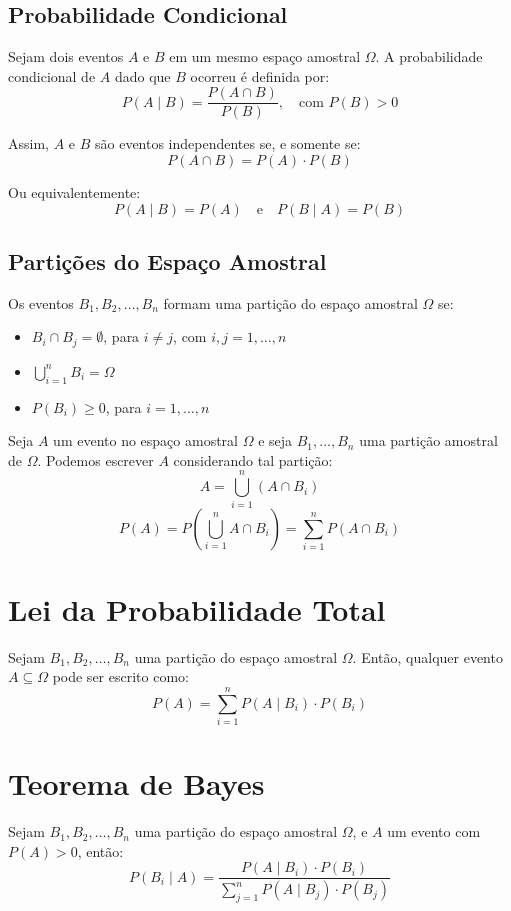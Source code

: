 \documentclass{article}
\begin{document}
\subsection{Probabilidade Condicional}
Sejam dois eventos $A$ e $B$ em um mesmo espaço amostral $\Omega$.  
A probabilidade condicional de $A$ dado que $B$ ocorreu é definida por:
    $$
    P(A \mid B) = \frac{P(A \cap B)}{P(B)}, \quad \text{com } P(B) > 0
    $$

Assim, $A$ e $B$ são eventos independentes se, e somente se:
    $$
    P(A \cap B) = P(A) \cdot P(B)
    $$

Ou equivalentemente:
    $$
    P(A \mid B) = P(A) \quad \text{e} \quad P(B \mid A) = P(B)
    $$

\subsection{Partições do Espaço Amostral}
Os eventos $B_1, B_2, \dots, B_n$ formam uma partição do espaço amostral $\Omega$ se:

\begin{itemize}
    \item $B_i \cap B_j = \emptyset$, para $i \neq j$, com $i, j = 1, \dots, n$
    \item $\bigcup_{i=1}^n B_i = \Omega$
    \item $P(B_i) \geq 0$, para $i = 1, \dots, n$
\end{itemize}

Seja $A$ um evento no espaço amostral $\Omega$ e seja $B_1, \dots, B_n$ uma partição amostral de $\Omega$. Podemos escrever $A$ considerando tal partição:
    $$
    A = \bigcup_{i=1}^n (A \cap B_i)
    $$
    $$
    P(A) = P\left( \bigcup_{i=1}^n A \cap B_i \right) = \sum_{i=1}^n P(A \cap B_i)
    $$

\section{Lei da Probabilidade Total}
Sejam $B_1, B_2, \dots, B_n$ uma partição do espaço amostral $\Omega$. Então, qualquer evento $A \subseteq \Omega$ pode ser escrito como:
    $$
    P(A) = \sum_{i=1}^n P(A \mid B_i) \cdot P(B_i)
    $$

\section{Teorema de Bayes}
Sejam $B_1, B_2, \dots, B_n$ uma partição do espaço amostral $\Omega$, e $A$ um evento com $P(A) > 0$, então:
    $$
    P(B_i \mid A) = \frac{P(A \mid B_i) \cdot P(B_i)}{\sum_{j=1}^n P(A \mid B_j) \cdot P(B_j)}
    $$
\end{document}
